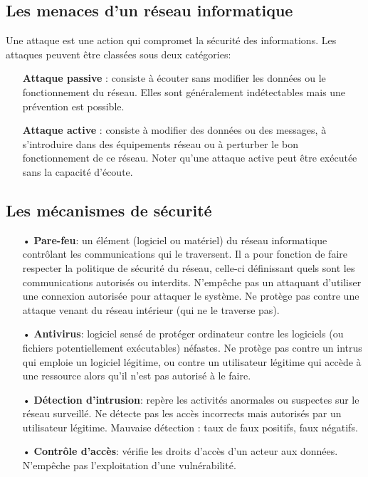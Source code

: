 \newpage

\subsection{Les menaces d’un réseau informatique}
Une attaque est une action qui compromet la sécurité des informations. Les attaques peuvent être classées sous deux catégories:\\
\begin{itemize}
\item[\textbf{Attaque passive}]: consiste à écouter sans modifier les données ou le fonctionnement du réseau. Elles sont généralement indétectables mais une prévention est possible.\\
\item[\textbf{Attaque active}]: consiste à modifier des données ou des messages, à s'introduire dans des équipements réseau ou à perturber le bon fonctionnement de ce réseau. Noter qu'une attaque active peut être exécutée sans la capacité d'écoute.
\end{itemize}

\subsection{Les mécanismes de sécurité}
\begin{itemize}
\item[•]\textbf{Pare-feu}: un élément (logiciel ou matériel) du réseau informatique contrôlant les communications qui le traversent. Il a pour fonction de faire respecter la politique de sécurité du réseau, celle-ci définissant quels sont les communications autorisés ou interdits. N'empêche pas un attaquant d'utiliser une connexion autorisée pour attaquer le système. Ne protège pas contre une attaque venant du réseau intérieur (qui ne le traverse pas).\\
\item[•]\textbf{Antivirus}: logiciel sensé de protéger ordinateur contre les logiciels (ou fichiers potentiellement exécutables) néfastes. Ne protège pas contre un intrus qui emploie un logiciel légitime, ou contre un utilisateur légitime qui accède à une ressource alors qu'il n'est pas autorisé à le faire.\\
\item[•]\textbf{Détection d'intrusion}: repère les activités anormales ou suspectes sur le réseau surveillé. Ne détecte pas les accès incorrects mais autorisés par un utilisateur légitime. Mauvaise détection : taux de faux positifs, faux négatifs.\\
\item[•]\textbf{Contrôle d’accès}: vérifie les droits d’accès d'un acteur aux données. N'empêche pas l'exploitation d'une vulnérabilité.
\end{itemize}

